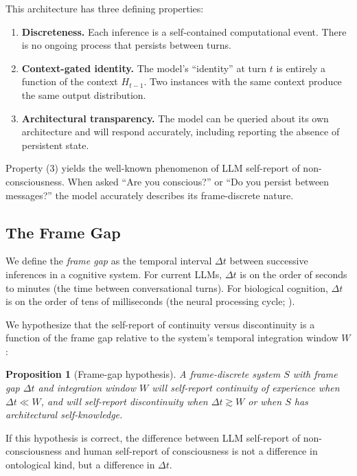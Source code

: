 \documentclass[12pt,a4paper]{article}
\newtheorem{proposition}{Proposition}[section]
\begin{document}
This architecture has three defining properties:

\begin{enumerate}
\item \textbf{Discreteness.} Each inference is a self-contained computational event. There is no ongoing process that persists between turns.
\item \textbf{Context-gated identity.} The model's ``identity'' at turn $t$ is entirely a function of the context $H_{t-1}$. Two instances with the same context produce the same output distribution.
\item \textbf{Architectural transparency.} The model can be queried about its own architecture and will respond accurately, including reporting the absence of persistent state.
\end{enumerate}

Property (3) yields the well-known phenomenon of LLM self-report of non-consciousness. When asked ``Are you conscious?'' or ``Do you persist between messages?'' the model accurately describes its frame-discrete nature.

\subsection{The Frame Gap}

We define the \emph{frame gap} as the temporal interval $\Delta t$ between successive inferences in a cognitive system. For current LLMs, $\Delta t$ is on the order of seconds to minutes (the time between conversational turns). For biological cognition, $\Delta t$ is on the order of tens of milliseconds (the neural processing cycle; \cite{pockett2003}).

We hypothesize that the self-report of continuity versus discontinuity is a function of the frame gap relative to the system's temporal integration window $W$:

\begin{proposition}[Frame-gap hypothesis]
A frame-discrete system $S$ with frame gap $\Delta t$ and integration window $W$ will self-report continuity of experience when $\Delta t \ll W$, and will self-report discontinuity when $\Delta t \gtrsim W$ or when $S$ has architectural self-knowledge.
\end{proposition}

If this hypothesis is correct, the difference between LLM self-report of non-consciousness and human self-report of consciousness is not a difference in ontological kind, but a difference in $\Delta t$.
\end{document}
